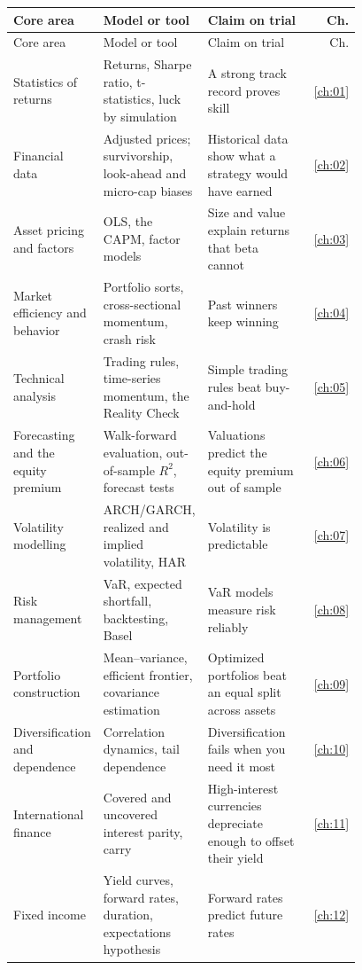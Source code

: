 \begingroup
\small
\setlength{\LTpre}{6pt}\setlength{\LTpost}{6pt}
\begin{longtable}{@{}>{\raggedright\arraybackslash}p{0.198\linewidth}>{\raggedright\arraybackslash}p{0.288\linewidth}>{\raggedright\arraybackslash}p{0.297\linewidth}r@{}}
\toprule
Core area & Model or tool & Claim on trial & Ch. \\
\midrule
\endfirsthead
\toprule
Core area & Model or tool & Claim on trial & Ch. \\
\midrule
\endhead
\bottomrule
\endlastfoot
Statistics of returns & Returns, Sharpe ratio, t-statistics, luck by simulation & A strong track record proves skill & \ref{ch:01} \\
Financial data & Adjusted prices; survivorship, look-ahead and micro-cap biases & Historical data show what a strategy would have earned & \ref{ch:02} \\
Asset pricing and factors & OLS, the CAPM, factor models & Size and value explain returns that beta cannot & \ref{ch:03} \\
Market efficiency and behavior & Portfolio sorts, cross-sectional momentum, crash risk & Past winners keep winning & \ref{ch:04} \\
Technical analysis & Trading rules, time-series momentum, the Reality Check & Simple trading rules beat buy-and-hold & \ref{ch:05} \\
Forecasting and the equity premium & Walk-forward evaluation, out-of-sample $R^2$, forecast tests & Valuations predict the equity premium out of sample & \ref{ch:06} \\
Volatility modelling & ARCH/GARCH, realized and implied volatility, HAR & Volatility is predictable & \ref{ch:07} \\
Risk management & VaR, expected shortfall, backtesting, Basel & VaR models measure risk reliably & \ref{ch:08} \\
Portfolio construction & Mean--variance, efficient frontier, covariance estimation & Optimized portfolios beat an equal split across assets & \ref{ch:09} \\
Diversification and dependence & Correlation dynamics, tail dependence & Diversification fails when you need it most & \ref{ch:10} \\
International finance & Covered and uncovered interest parity, carry & High-interest currencies depreciate enough to offset their yield & \ref{ch:11} \\
Fixed income & Yield curves, forward rates, duration, expectations hypothesis & Forward rates predict future rates & \ref{ch:12} \\

\end{longtable}
